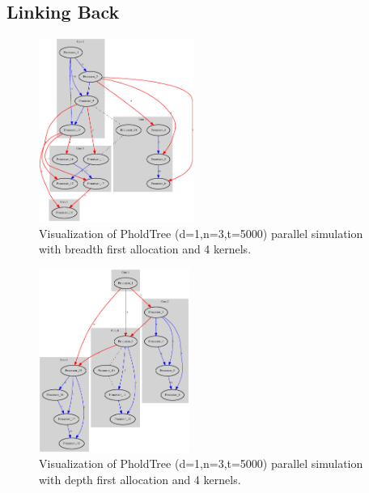 \subsection{Linking Back}

\begin{figure}
    \center
    \includegraphics[width=\plotfraction\columnwidth,  height=6cm, keepaspectratio]{fig/pholdtreed1n3t5000c4BFS.eps}
    \caption{Visualization of PholdTree (d=1,n=3,t=5000) parallel simulation with breadth first allocation and 4 kernels.}
    \label{fig:pholdtree_visualize_parBFS}
\end{figure}
\begin{figure}
    \center
    \includegraphics[width=\plotfraction\columnwidth,  height=6cm, keepaspectratio]{fig/pholdtreed1n3t5000c4DFS.eps}
    \caption{Visualization of PholdTree (d=1,n=3,t=5000) parallel simulation with depth first allocation and 4 kernels.}
    \label{fig:pholdtree_visualize_parDFS}
\end{figure}
